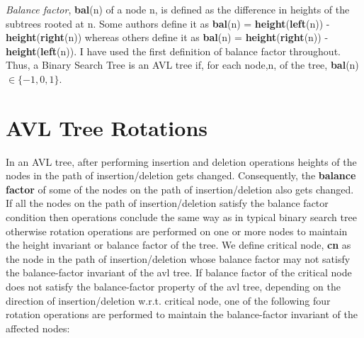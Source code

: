 \documentclass[MTech]{iitmdiss}
\begin{document}
\textit{Balance factor}, \textbf{bal}(n) of a node n, is defined as the difference in heights of the subtrees rooted at n. Some authors define it as \textbf{bal}(n) = \textbf{height}(\textbf{left}(n)) - \textbf{height}(\textbf{right}(n)) whereas others define it as \textbf{bal}(n) = \textbf{height}(\textbf{right}(n)) - \textbf{height}(\textbf{left}(n)).
I have used the first definition of balance factor throughout. Thus, a Binary Search Tree is an AVL tree if, for each node,n, of the tree, \textbf{bal}(n) $\in\{-1,0,1\}$. 


\section{AVL Tree Rotations}
In an AVL tree, after performing insertion and deletion operations heights of the nodes in the path of insertion/deletion gets changed. Consequently, the \textbf{balance factor} of some of the nodes on the path of insertion/deletion also gets changed. If
all the nodes on the path of insertion/deletion satisfy the balance factor condition then operations conclude the same way as in typical binary search tree otherwise rotation operations are performed on one or more nodes to maintain the height invariant
or balance factor of the tree. We define critical node, \textbf{cn} as the node in the path of insertion/deletion whose balance factor may not satisfy the balance-factor invariant of the avl tree. If balance factor of the critical node does not satisfy the balance-factor property of the avl tree, depending on the direction of insertion/deletion w.r.t. critical node, one of the following four rotation
operations are performed to maintain the balance-factor invariant of the affected nodes:
\end{document}
